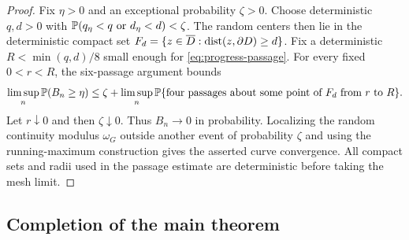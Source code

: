 \begin{proof}
Fix $\eta>0$ and an exceptional probability $\zeta>0$.  Choose
deterministic $q,d>0$ with
$\mathbb P(q_\eta<q\text{ or }d_\eta<d)<\zeta$.  The random
centers then lie in the deterministic compact set
$F_d=\{z\in\overline D:\operatorname{dist}(z,\partial D)\ge d\}$.
Fix a deterministic $R<\min(q,d)/8$ small enough for
\eqref{eq:progress-passage}.  For every fixed $0<r<R$, the
six-passage argument bounds
\[
 \limsup_n\mathbb P(B_n\ge\eta)
 \le \zeta+\limsup_n\mathbb P\{\text{four passages about some point of }
                                      F_d\text{ from }r\text{ to }R\}.
\]
Let $r\downarrow0$ and then $\zeta\downarrow0$.  Thus
$B_n\to0$ in probability.  Localizing the random continuity
modulus $\omega_G$ outside another event of probability $\zeta$
and using the running-maximum construction gives the asserted
curve convergence.  All compact sets and radii used in the passage
estimate are deterministic before taking the mesh limit.
\end{proof}

\subsection{Completion of the main theorem}

